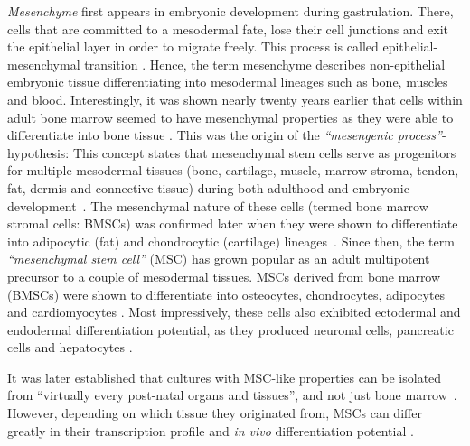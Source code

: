 \emph{Mesenchyme} first appears in embryonic development during gastrulation.
There, cells that are committed to a mesodermal fate, lose their cell junctions
and exit the epithelial layer in order to migrate freely. This process is called
epithelial-mesenchymal transition
\cite{tamFormationMesodermalTissues1987,nowotschinCellularDynamicsEarly2010}.
Hence, the term mesenchyme describes non-epithelial embryonic tissue
differentiating into mesodermal lineages such as bone, muscles and blood.
Interestingly, it was shown nearly twenty years earlier that cells within adult
bone marrow seemed to have mesenchymal properties as they were able to
differentiate into bone tissue
\cite{friedensteinOsteogenesisTransplantsBone1966,
    friedensteinOsteogenicPrecursorCells1971, biancoMesenchymalStemCells2014}. This
was the origin of the \emph{``mesengenic process''}-hypothesis: This concept
states that mesenchymal stem cells serve as progenitors for multiple mesodermal
tissues (bone, cartilage, muscle, marrow stroma, tendon, fat, dermis and
connective tissue) during both adulthood and embryonic
development~\cite{caplanMesenchymalStemCells1991,caplanMesengenicProcess1994}.
The mesenchymal nature of these cells (termed bone marrow stromal cells: \acp{BMSC})
was confirmed later when they were shown to differentiate into adipocytic (fat)
and chondrocytic (cartilage)
lineages~\cite{pittengerMultilineagePotentialAdult1999}. Since then, the term
\emph{``mesenchymal stem cell''} (MSC) has grown popular as an adult multipotent
precursor to a couple of mesodermal tissues. \acp{MSC} derived from bone marrow
(\acp{BMSC}) were shown to differentiate into osteocytes, chondrocytes, adipocytes
and cardiomyocytes \cite{gronthosSTRO1FractionAdult1994,
    muruganandanAdipocyteDifferentiationBone2009, xuMesenchymalStemCells2004}. Most
impressively, these cells also exhibited ectodermal and endodermal
differentiation potential, as they produced neuronal cells, pancreatic cells and
hepatocytes \cite{barzilayLentiviralDeliveryLMX1a2009,
    wilkinsHumanBoneMarrowderived2009, gabrInsulinproducingCellsAdult2013,
    stockHumanBoneMarrow2014}.

It was later established that cultures with MSC-like
properties can be isolated from ``virtually every post-natal organs and
tissues'', and not just bone
marrow~\cite{dasilvameirellesMesenchymalStemCells2006}. However, depending on
which tissue they originated from, \acp{MSC} can differ greatly in their
transcription profile and \textit{in vivo} differentiation potential
\cite{jansenFunctionalDifferencesMesenchymal2010,sacchettiNoIdenticalMesenchymal2016}.


